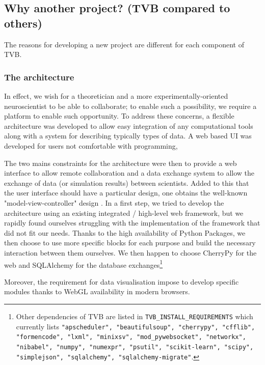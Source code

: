 \subsection{Why another project? (TVB compared to others)}

The reasons for developing a new project are different for each component of
TVB.

\subsubsection{The architecture}

In effect, we wish for a theoretician and a more experimentally-oriented
neuroscientist to be able to collaborate; to enable such a possibility, we
require a platform to enable such opportunity.
To address these concerns, a flexible architecture was developed to
allow easy integration of any computational tools along with a system
for describing typically types of data. A web based UI was developed
for users not comfortable with programming, 

The two mains constraints for the architecture were then to provide a web
interface to allow remote collaboration and a data exchange system to allow the
exchange of data (or simulation results) between scientists. Added to this that
the user interface should have a particular design, one obtains the well-known
"model-view-controller" design . In a first step, we
tried to develop the architecture using an existing integrated / high-level web
framework, but we rapidly found ourselves struggling with the implementation of
the framework that did not fit our needs. Thanks to the high availability of
Python Packages, we then choose to use more specific blocks for each purpose and
build the necessary interaction between them ourselves. We then happen to choose
\textsf{CherryPy} for the web  and \textsf{SQLAlchemy} for the database
exchanges\footnote{Other dependencies of TVB are listed in
    \texttt{TVB\_INSTALL\_REQUIREMENTS} which currently lists
    \texttt{"apscheduler", "beautifulsoup", "cherrypy", "cfflib", "formencode",
        "lxml", "minixsv", "mod\_pywebsocket", "networkx", "nibabel", "numpy",
        "numexpr", "psutil", "scikit-learn", "scipy", "simplejson",
        "sqlalchemy", "sqlalchemy-migrate"}.}

Moreover, the requirement for data visualisation impose to develop specific
modules thanks to WebGL availability in modern browsers.

